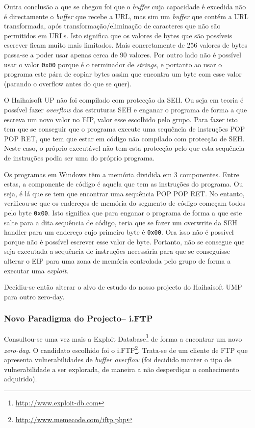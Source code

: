 \documentclass[a4paper]{article}
\begin{document}
Outra conclusão a que se chegou foi que o \textit{buffer} cuja capacidade é excedida não é directamente o \textit{buffer} que recebe a URL, mas sim um \textit{buffer} que contém a URL transformada, após transformação/eliminação de caracteres que não são permitidos em URLs. Isto significa que os valores de bytes que são possíveis escrever ficam muito mais limitados. Mais concretamente de 256 valores de bytes passa-se a poder usar apenas cerca de 90 valores. Por outro lado não é possível usar o valor \texttt{0x00} porque é o terminador de \textit{strings}, e portanto ao usar o programa este pára de copiar bytes assim que encontra um byte com esse valor (parando o overflow antes do que se quer).

O Haihaisoft UP não foi compilado com protecção da SEH. Ou seja em teoria é possível fazer \textit{overflow} das estruturas SEH e enganar o programa de forma a que escreva um novo valor no EIP, valor esse escolhido pelo grupo. Para fazer isto tem que se conseguir que o programa execute uma sequência de instruções POP POP RET, que tem que estar em código não compilado com protecção de SEH. Neste caso, o próprio executável não tem esta protecção pelo que esta sequência de instruções podia ser uma do próprio programa.

Os programas em Windows têm a memória dividida em 3 componentes. Entre estas, a componente de código é aquela que tem as instruções do programa. Ou seja, é lá que se tem que encontrar uma sequência POP POP RET. No entanto, verificou-se que os endereços de memória do segmento de código começam todos pelo byte \texttt{0x00}. Isto significa que para enganar o programa de forma a que este salte para a dita sequência de código, teria que se fazer um overwrite da SEH handler para um endereço cujo primeiro byte é \texttt{0x00}. Ora isso não é possível porque não é possível escrever esse valor de byte. Portanto, não se consegue que seja executada a sequência de instruções necessária para que se conseguísse alterar o EIP para uma zona de memória controlada pelo grupo de forma a executar uma \textit{exploit}.

Decidiu-se então alterar o alvo de estudo do nosso projecto do Haihaisoft UMP para outro zero-day.


\subsubsection{Novo Paradigma do Projecto-- i.FTP}
Consultou-se uma vez mais a Exploit Database\footnote{\url{http://www.exploit-db.com}} de forma a encontrar um novo \textit{zero-day}. O candidato escolhido foi o i.FTP\footnote{\url{http://www.memecode.com/iftp.php}}. Trata-se de um cliente de FTP que apresenta vulnerabilidades de \textit{buffer overflow} (foi decidido manter o tipo de vulnerabilidade a ser explorada, de maneira a não desperdiçar o conhecimento adquirido).
\end{document}
